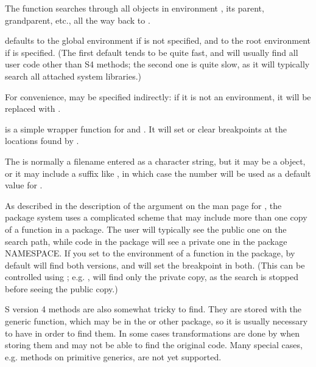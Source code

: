 %
\begin{Details}\relax
The  function searches through all objects in
environment , its parent, grandparent, etc., all the way
back to .

 defaults to the global environment if
 is not specified, and to the
root environment  if  is
specified.  (The first default tends to be quite fast, and will
usually find all user code other than S4 methods; the second one is
quite slow, as it will typically search all attached system
libraries.)

For convenience,  may be specified indirectly:  if it is
not an environment, it will be replaced with
.

 is a simple wrapper function for
 and .  It will set or clear
breakpoints at the locations found by .

The  is normally a filename entered as a character
string, but it may be a  object, or it may
include a suffix like , in which case the number
 will be used as a default value for .

As described in the description of the  argument on the
man page for , the \R{} package system uses a
complicated scheme that may include more than one copy of a function
in a package.  The user will typically see the public one on the
search path, while code in the package will see a private one in the
package NAMESPACE.  If you set  to the environment of a
function in the package, by default  will find both
versions, and  will set the breakpoint in both.
(This can be controlled using ; e.g. 
,  will find only the
private copy, as the search is stopped before seeing the public
copy.)

S version 4 methods are also somewhat tricky to find.  They are stored
with the generic function, which may be in the  or other
package, so it is usually necessary to have 
in order to find them.  In some cases transformations are done by \R{}
when storing them and  may not be able to find the
original code.  Many special cases, e.g. methods on primitive
generics, are not yet supported.
\end{Details}
